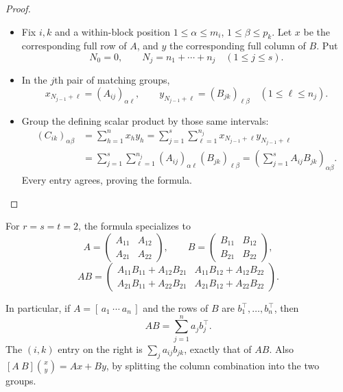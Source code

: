 \begin{proof}
\begin{itemize}
\item Fix \(i,k\) and a within-block position
\(1\leqslant\alpha\leqslant m_i\), \(1\leqslant\beta\leqslant p_k\).
Let \(x\) be the corresponding full row of \(A\), and \(y\) the
corresponding full column of \(B\). Put
\[
 N_0=0,\qquad N_j=n_1+\cdots+n_j\quad(1\leqslant j\leqslant s).
\]
\item In the \(j\)th pair of matching groups,
\[
 x_{N_{j-1}+\ell}=(A_{ij})_{\alpha\ell},\qquad
 y_{N_{j-1}+\ell}=(B_{jk})_{\ell\beta}
 \quad(1\leqslant\ell\leqslant n_j).
\]
\item Group the defining scalar product by those same intervals:
\[
\begin{aligned}
 (C_{ik})_{\alpha\beta}
 &=\sum_{h=1}^{n}x_hy_h
 =\sum_{j=1}^{s}\sum_{\ell=1}^{n_j}
     x_{N_{j-1}+\ell}y_{N_{j-1}+\ell}\\
 &=\sum_{j=1}^{s}\sum_{\ell=1}^{n_j}
     (A_{ij})_{\alpha\ell}(B_{jk})_{\ell\beta}
 =\left(\sum_{j=1}^{s}A_{ij}B_{jk}\right)_{\alpha\beta}.
\end{aligned}
\]
Every entry agrees, proving the formula.
\end{itemize}
\end{proof}

For \(r=s=t=2\), the formula specializes to
\[
A=\begin{pmatrix}A_{11}&A_{12}\\A_{21}&A_{22}\end{pmatrix},\qquad
B=\begin{pmatrix}B_{11}&B_{12}\\B_{21}&B_{22}\end{pmatrix},
\]
\[
AB=\begin{pmatrix}
A_{11}B_{11}+A_{12}B_{21}&A_{11}B_{12}+A_{12}B_{22}\\
A_{21}B_{11}+A_{22}B_{21}&A_{21}B_{12}+A_{22}B_{22}
\end{pmatrix}.
\]

In particular, if \(A=[\,a_1\ \cdots\ a_n\,]\) and the rows of \(B\)
are \(b_1^\top,\ldots,b_n^\top\), then
\[
AB=\sum_{j=1}^n a_jb_j^\top.
\]
The \((i,k)\) entry on the right is \(\sum_j a_{ij}b_{jk}\), exactly
that of \(AB\). Also \([A\ B]\binom{x}{y}=Ax+By\), by splitting the
column combination into the two groups.


